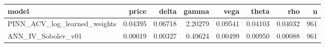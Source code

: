 \begin{tabular}{lrrrrrrr}
\toprule
model & price & delta & gamma & vega & theta & rho & n \\
\midrule
PINN_ACV_log_learned_weights & 0.04395 & 0.06718 & 2.20279 & 0.09541 & 0.04103 & 0.04032 & 961 \\
ANN_IV_Sobolev_v01 & 0.00019 & 0.00327 & 0.49624 & 0.00499 & 0.00950 & 0.00088 & 961 \\
\bottomrule
\end{tabular}
